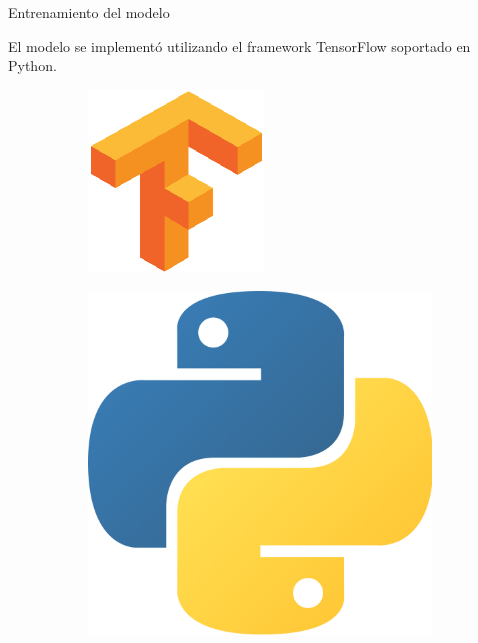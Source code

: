 \documentclass[12pt]{beamer}
\begin{document}
\begin{frame}{Entrenamiento del modelo}

    {\scriptsize
    El modelo se implementó utilizando el framework TensorFlow soportado en Python.

    \begin{figure}[h]
        \begin{subfigure}{0.4\textwidth}
            \centering
            \includegraphics[scale=0.2]{figs/tensorflow.png}
        \end{subfigure}
        \begin{subfigure}{0.46\textwidth}
            \centering
            \includegraphics[scale=0.03]{figs/python.png}  
        \end{subfigure}
    \end{figure}
    
}
\end{frame}
\end{document}
